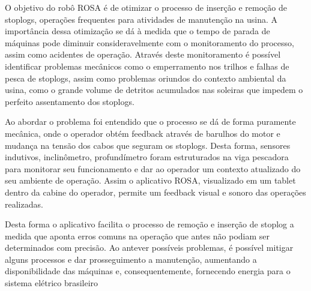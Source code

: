 O objetivo do robô ROSA é de otimizar o processo de inserção e remoção de
stoplogs, operações frequentes para atividades de manutenção na usina. A
importância dessa otimização se dá à medida que o tempo de parada de máquinas
pode diminuir consideravelmente com o monitoramento do processo, assim como
acidentes de operação. Através deste monitoramento é possível identificar
problemas mecânicos como o emperramento nos trilhos e falhas de pesca de
stoplogs, assim como problemas oriundos do contexto ambiental da usina, como o
grande volume de detritos acumulados nas soleiras que impedem o perfeito
assentamento dos stoplogs.

Ao abordar o problema foi entendido que o processo se dá de forma puramente
mecânica, onde o operador obtém feedback através de barulhos do motor e mudança
na tensão dos cabos que seguram os stoplogs. Desta forma, sensores indutivos,
inclinômetro, profundímetro foram estruturados na viga pescadora para monitorar
seu funcionamento e dar ao operador um contexto atualizado do seu ambiente de
operação. Assim o aplicativo ROSA, visualizado em um tablet dentro da cabine do
operador, permite um feedback visual e sonoro das operações realizadas.

Desta forma o aplicativo facilita o processo de remoção e inserção de stoplog a
medida que aponta erros comuns na operação que antes não podiam ser determinados com
precisão. Ao antever possíveis problemas, é possível mitigar alguns processos e
dar prosseguimento a manutenção, aumentando a disponibilidade das máquinas e,
consequentemente, fornecendo energia para o sistema elétrico brasileiro
